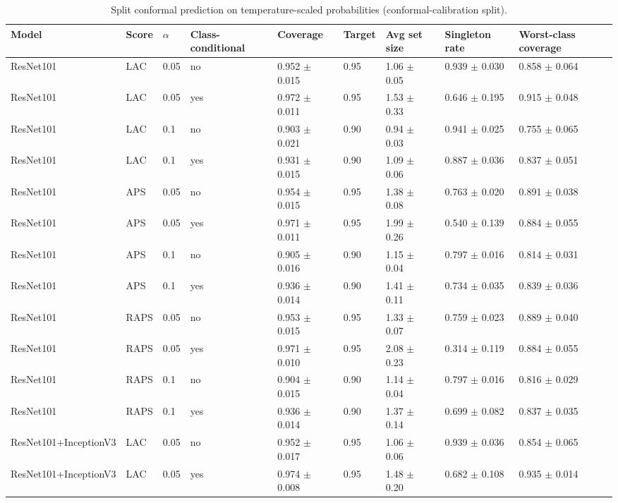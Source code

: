 \begin{table}[ht]
\centering
\small
\caption{Split conformal prediction on temperature-scaled probabilities (conformal-calibration split).}
\label{tab:tab5_conformal}
\begin{tabular}{lllllllll}
\hline
Model & Score & $\alpha$ & Class-conditional & Coverage & Target & Avg set size & Singleton rate & Worst-class coverage \\
\hline
ResNet101 & LAC & 0.05 & no & 0.952 $\pm$ 0.015 & 0.95 & 1.06 $\pm$ 0.05 & 0.939 $\pm$ 0.030 & 0.858 $\pm$ 0.064 \\
ResNet101 & LAC & 0.05 & yes & 0.972 $\pm$ 0.011 & 0.95 & 1.53 $\pm$ 0.33 & 0.646 $\pm$ 0.195 & 0.915 $\pm$ 0.048 \\
ResNet101 & LAC & 0.1 & no & 0.903 $\pm$ 0.021 & 0.90 & 0.94 $\pm$ 0.03 & 0.941 $\pm$ 0.025 & 0.755 $\pm$ 0.065 \\
ResNet101 & LAC & 0.1 & yes & 0.931 $\pm$ 0.015 & 0.90 & 1.09 $\pm$ 0.06 & 0.887 $\pm$ 0.036 & 0.837 $\pm$ 0.051 \\
ResNet101 & APS & 0.05 & no & 0.954 $\pm$ 0.015 & 0.95 & 1.38 $\pm$ 0.08 & 0.763 $\pm$ 0.020 & 0.891 $\pm$ 0.038 \\
ResNet101 & APS & 0.05 & yes & 0.971 $\pm$ 0.011 & 0.95 & 1.99 $\pm$ 0.26 & 0.540 $\pm$ 0.139 & 0.884 $\pm$ 0.055 \\
ResNet101 & APS & 0.1 & no & 0.905 $\pm$ 0.016 & 0.90 & 1.15 $\pm$ 0.04 & 0.797 $\pm$ 0.016 & 0.814 $\pm$ 0.031 \\
ResNet101 & APS & 0.1 & yes & 0.936 $\pm$ 0.014 & 0.90 & 1.41 $\pm$ 0.11 & 0.734 $\pm$ 0.035 & 0.839 $\pm$ 0.036 \\
ResNet101 & RAPS & 0.05 & no & 0.953 $\pm$ 0.015 & 0.95 & 1.33 $\pm$ 0.07 & 0.759 $\pm$ 0.023 & 0.889 $\pm$ 0.040 \\
ResNet101 & RAPS & 0.05 & yes & 0.971 $\pm$ 0.010 & 0.95 & 2.08 $\pm$ 0.23 & 0.314 $\pm$ 0.119 & 0.884 $\pm$ 0.055 \\
ResNet101 & RAPS & 0.1 & no & 0.904 $\pm$ 0.015 & 0.90 & 1.14 $\pm$ 0.04 & 0.797 $\pm$ 0.016 & 0.816 $\pm$ 0.029 \\
ResNet101 & RAPS & 0.1 & yes & 0.936 $\pm$ 0.014 & 0.90 & 1.37 $\pm$ 0.14 & 0.699 $\pm$ 0.082 & 0.837 $\pm$ 0.035 \\
ResNet101+InceptionV3 & LAC & 0.05 & no & 0.952 $\pm$ 0.017 & 0.95 & 1.06 $\pm$ 0.06 & 0.939 $\pm$ 0.036 & 0.854 $\pm$ 0.065 \\
ResNet101+InceptionV3 & LAC & 0.05 & yes & 0.974 $\pm$ 0.008 & 0.95 & 1.48 $\pm$ 0.20 & 0.682 $\pm$ 0.108 & 0.935 $\pm$ 0.014 \\

\end{tabular}
\end{table}
